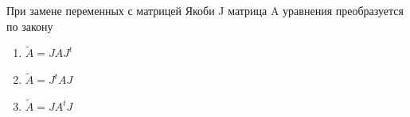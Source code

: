 При замене переменных с матрицей Якоби J матрица A уравнения преобразуется по закону

\begin{enumerate}[label=\arabic*)]
    \item \(\widetilde{A}=J A J^t\)
    \item \(\widetilde{A} = J^t A J\)
    \item \(\widetilde{A}=J A^t J\)
\end{enumerate}


